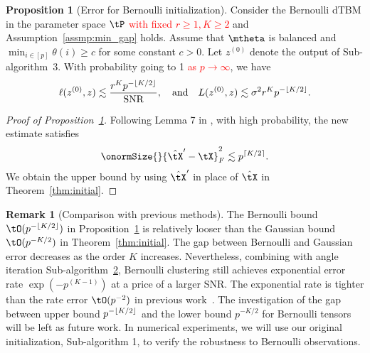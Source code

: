 \documentclass[lettersize,onecolumn,journal]{IEEEtran}
\theoremstyle{definition}
\newtheorem{prop}{Proposition}
\theoremstyle{definition}
\newtheorem{rmk}{Remark}
\newcommand{\of}[1]{\left(#1\right)}
\DeclarePairedDelimiter{\ceil}{\lceil}{\rceil}
\DeclarePairedDelimiter{\floor}{\lfloor}{\rfloor}
\begin{document}
{\begin{itemize}[wide]
\begin{prop}[Error for Bernoulli initialization]\label{cor:ber} Consider the Bernoulli dTBM in the parameter space $\tP$ \textcolor{red}{with fixed $r \geq 1, K \geq 2$} and Assumption~\ref{assmp:min_gap} holds. Assume that $\mtheta$ is balanced and $\min_{i\in[p]}\theta(i) \geq c$ for some constant $c>0$. Let $ z^{(0)}$ denote the output of Sub-algorithm~3. With probability going to 1 \textcolor{red}{as $p \rightarrow \infty$}, we have
\begin{equation}\label{eq:ini_b}
 \ell(z^{(0)}, z) \lesssim \frac{r^K p^{- \floor{K/2} }}{\text{SNR}}, \quad \text{and} \quad L(z^{(0)}, z) \lesssim  {\sigma^2 r^K p^{-\floor{K/2}}}.
\end{equation}
\end{prop}

\begin{proof}[Proof of Proposition~\ref{cor:ber}] Following Lemma 7 in \cite{gao2018community}, with high probability, the new estimate satisfies
\begin{equation}
    \onormSize{}{\hat \tX' - \tX}_F^2 \lesssim p^{\ceil{K/2}}.
\end{equation} 
We obtain the upper bound by using $\hat \tX'$ in place of $\hat \tX$ in Theorem~\ref{thm:initial}.
\end{proof}

\begin{rmk}[Comparison with previous methods] The Bernoulli bound $\tO(p^{- \floor{K/2} })$ in Proposition~\ref{cor:ber} is relatively looser than the Gaussian bound $\tO(p^{- K/2 })$ in Theorem~\ref{thm:initial}. The gap between Bernoulli and Gaussian error decreases as the order $K$ increases. Nevertheless, combining with angle iteration Sub-algorithm~\hyperref[alg:main]{2}, Bernoulli clustering still achieves exponential error rate $\exp \of{ - p^{(K-1)}}$ at a price of a larger SNR.
The exponential rate is tighter than the rate error $\tO(p^{-2})$ in previous work~\citep{ke2019community}. The investigation of the gap between upper bound $p^{- \floor{K/2}}$ and the lower bound $p^{- K/2}$ for Bernoulli tensors will be left as future work. In numerical experiments, we will use our original initialization, Sub-algorithm 1, to verify the robustness to Bernoulli observations.
\end{rmk}



\end{itemize}}
\end{document}
